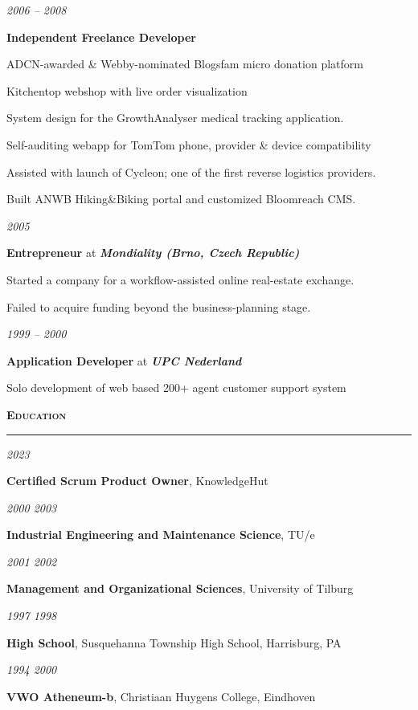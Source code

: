 \documentclass[a4paper,11pt]{article}
\newlength{\sectionindent}
\newlength{\marginwidth}
\newlength{\sectionheaderindent}
\newcommand{\sectionheader}[1]{
    \vspace{1mm}
    \begin{minipage}[t]{\textwidth}
        \hspace{\sectionheaderindent}\textbf{\textsc{#1}}\\[-8pt\baselineskip] 
        \rule{\textwidth}{1pt}
    \end{minipage}\strut\vspace{3mm}}
\newcommand{\margin}[1]{
    \begin{minipage}[t]{\dimexpr\sectionindent-\marginwidth}
        \begin{flushright}
            \textit{#1}
        \end{flushright}
    \end{minipage}
    \hspace{\marginwidth}}
\newenvironment{descriptionsection}{
    \begingroup
    \setlength{\parskip}{4pt plus 2pt minus 1pt} 
}{
    \endgroup
}
\newcommand{\jobentry}[4]{
    \margin{#1}
    \begin{minipage}[t]{\dimexpr\textwidth-\sectionindent}
        \textbf{#2} at \textit{\textbf{#3}}\\[1pt]
        \begin{descriptionsection}
        #4
        \end{descriptionsection}
    \end{minipage}\vspace{4pt}}
\newcommand{\itemizedjobentry}[3]{
  \margin{#1}
  \begin{minipage}[t]{\dimexpr\textwidth-\sectionindent}
    \textbf{#2}
    \vspace{1pt}
    \begin{customitemize}
      #3
    \end{customitemize}
    \vspace{1pt}
  \end{minipage}}
\newcommand{\educationentry}[4]{
    \margin{
        #1 \ifthenelse{\equal{#1}{}}{}{--} #2
    }
    \begin{minipage}[t]{\dimexpr\textwidth-\sectionindent}
        \textbf{#3}, #4
    \end{minipage}
    \par}
\begin{document}
\itemizedjobentry{2006 -- 2008}{Independent Freelance Developer}{
    \item ADCN-awarded \& Webby-nominated Blogsfam micro donation platform
    \item Kitchentop webshop with live order visualization
    \item System design for the GrowthAnalyser medical tracking application.
    \item Self-auditing webapp for TomTom phone, provider \& device compatibility
    \item Assisted with launch of Cycleon; one of the first reverse logistics providers.
    \item Built ANWB Hiking\&Biking portal and customized Bloomreach CMS.
}

\jobentry{2005}{Entrepreneur}{Mondiality (Brno, Czech Republic)}{
Started a company for a workflow-assisted online real-estate exchange.

Failed to acquire funding beyond the business-planning stage.}

\jobentry{1999 -- 2000}{Application Developer}{UPC Nederland}{Solo development of web based 200+ agent customer support system}

\sectionheader{Education}
\educationentry{}{2023}{Certified Scrum Product Owner}{KnowledgeHut}
\educationentry{2000}{2003}{Industrial Engineering and Maintenance Science}{TU/e}
\educationentry{2001}{2002}{Management and Organizational Sciences}{University of Tilburg}
\educationentry{1997}{1998}{High School}{Susquehanna Township High School, Harrisburg, PA}
\educationentry{1994}{2000}{VWO Atheneum-b}{Christiaan Huygens College, Eindhoven}
\end{document}
